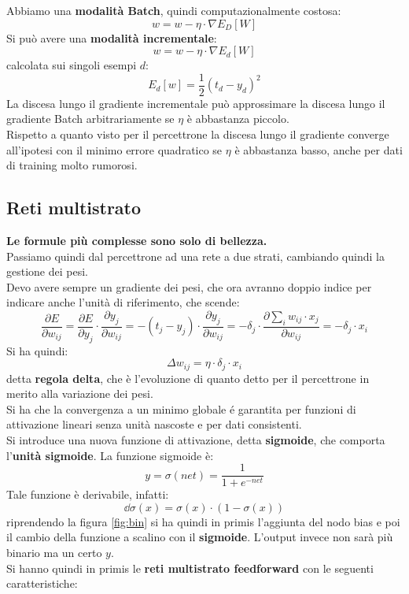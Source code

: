 \documentclass[a4paper,12pt, oneside]{book}
\begin{document}
Abbiamo una \textbf{modalità Batch}, quindi computazionalmente costosa:
\[w=w-\eta\cdot\nabla E_D[W]\]
Si può avere una \textbf{modalità incrementale}:
\[w=w-\eta\cdot\nabla E_d[W]\]
calcolata sui singoli esempi $d$:
\[E_d[w]=\frac{1}{2}(t_d-y_d)^2\]
La discesa lungo il gradiente incrementale può approssimare la discesa lungo
il gradiente Batch arbitrariamente se $\eta$ è abbastanza piccolo.\\
Rispetto a quanto visto per il percettrone la discesa lungo il gradiente
converge all'ipotesi con il minimo errore quadratico se  $\eta$ è abbastanza
basso, anche per dati di training molto rumorosi.
\subsection{Reti multistrato}
\textbf{Le formule più complesse sono solo di bellezza.}\\
\noindent
Passiamo quindi dal percettrone ad una rete a due strati, cambiando quindi la
gestione dei pesi.\\
Devo avere sempre un gradiente dei pesi, che ora avranno doppio indice per
indicare anche l'unità di riferimento, che scende:
\[\frac{\partial E}{\partial w_{ij}}=\frac{\partial E}{\partial y_{j}}\cdot
  \frac{\partial y_j}{\partial w_{ij}}=-(t_j-y_j)\cdot \frac{\partial
    y_j}{\partial w_{ij}}=-\delta_j\cdot\frac{\partial \sum_i w_{ij}\cdot
    x_j}{\partial w_{ij}}=-\delta_j\cdot x_i\]
Si ha quindi:
\[\Delta w_{ij}=\eta\cdot \delta_j\cdot x_i\]
detta \textbf{regola delta}, che è l'evoluzione di quanto detto per il
percettrone in merito alla variazione dei pesi.\\
Si ha che la convergenza a un minimo globale é garantita per funzioni di
attivazione lineari senza unità nascoste e per dati consistenti.\\
Si introduce una nuova funzione di attivazione, detta \textbf{sigmoide}, che
comporta l'\textbf{unità sigmoide}. La funzione sigmoide è:
\[y=\sigma(net)=\frac{1}{1+e^{-net}}\]
Tale funzione è derivabile, infatti:
\[\dd \sigma(x)=\sigma(x)\cdot (1-\sigma(x))\]
riprendendo la figura \ref{fig:bin} si ha quindi in primis l'aggiunta del nodo
bias e poi il cambio della funzione a scalino con il \textbf{sigmoide}. L'output
invece non sarà più binario ma un certo $y$.\\
Si hanno quindi in primis le \textbf{reti multistrato feedforward} con le
seguenti caratteristiche:
\end{document}
